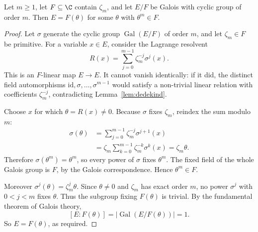 \begin{proposition}[Kummer]\label{prop:kummer}
Let $m\ge1$, let $F\subseteq\C$ contain $\zeta_m$, and let $E/F$ be Galois with cyclic group of order $m$. Then $E=F(\theta)$ for some $\theta$ with $\theta^m\in F$.
\end{proposition}
\begin{proof}
Let $\sigma$ generate the cyclic group
$\operatorname{Gal}(E/F)$ of order $m$,
and let $\zeta_m\in F$ be primitive.
For a variable $x\in E$, consider
the Lagrange resolvent
\[
R(x)=\sum_{j=0}^{m-1}
\zeta_m^{-j}\sigma^j(x).
\]
This is an $F$-linear map $E\to E$.
It cannot vanish identically:
if it did, the distinct field
automorphisms
$\mathrm{id},\sigma,\ldots,\sigma^{m-1}$
would satisfy a non-trivial
linear relation with coefficients
$\zeta_m^{-j}$, contradicting
Lemma~\ref{lem:dedekind}.

Choose $x$ for which $\theta=R(x)\ne0$.
Because $\sigma$ fixes $\zeta_m$,
reindex the sum modulo $m$:
\[
\begin{aligned}
\sigma(\theta)
&=\sum_{j=0}^{m-1}
\zeta_m^{-j}\sigma^{j+1}(x)\\
&=\zeta_m
\sum_{k=0}^{m-1}
\zeta_m^{-k}\sigma^k(x)
=\zeta_m\theta.
\end{aligned}
\]
Therefore $\sigma(\theta^m)=\theta^m$,
so every power of $\sigma$ fixes
$\theta^m$. The fixed field of the
whole Galois group is $F$,
by the Galois correspondence.
Hence $\theta^m\in F$.

Moreover
$\sigma^j(\theta)=\zeta_m^j\theta$.
Since $\theta\ne0$ and $\zeta_m$
has exact order $m$, no power
$\sigma^j$ with $0<j<m$ fixes $\theta$.
Thus the subgroup fixing $F(\theta)$
is trivial. By the fundamental theorem
of Galois theory,
\[
[E:F(\theta)]=
|\operatorname{Gal}(E/F(\theta))|=1.
\]
So $E=F(\theta)$, as required.
\end{proof}

